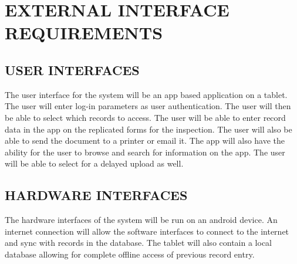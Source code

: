 \documentclass[twoside,letterpaper]{article}
\begin{document}
\clearpage\section[EXTERNAL INTERFACE
REQUIREMENTS]{\rmfamily\bfseries\color{black}
EXTERNAL INTERFACE
REQUIREMENTS}

\subsection[USER INTERFACES]{\rmfamily\bfseries\color{black}
USER INTERFACES}
{\rmfamily\color{black}
The user interface for the system will be an app based application on a tablet. The user will enter log-in parameters as user authentication. The user will then be able to select which records to access. The user will be able to enter record data in the app on the replicated forms for the inspection. The user will also be able to send the document to a printer or email it. The app will also have the ability for the user to browse and search for information on the app. The user will be able to select for a delayed upload as well.}

\subsection[HARDWARE INTERFACES]{\rmfamily\bfseries\color{black}
HARDWARE INTERFACES}
{\rmfamily\color{black}
  The hardware interfaces of the system will be run on an android device. An internet connection will allow the software interfaces to connect to the internet and sync with records in the database. The tablet will also contain a local database allowing for complete offline access of previous record entry.  }
\end{document}
